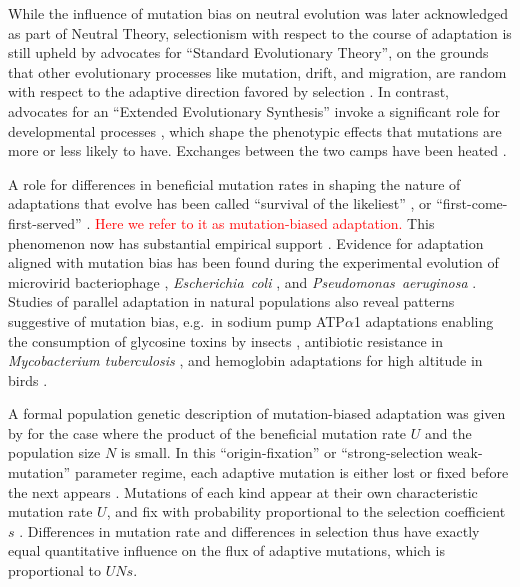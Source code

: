 \documentclass[9pt,twocolumn,twoside]{article}
\begin{document}
While the influence of mutation bias on neutral evolution was later acknowledged as part of Neutral Theory, selectionism with respect to the course of adaptation is still upheld by advocates for ``Standard Evolutionary Theory'', on the grounds that other evolutionary processes like mutation, drift, and migration, are random with respect to the adaptive direction favored by selection \citep{svensson2019role}. In contrast, advocates for an ``Extended Evolutionary Synthesis'' invoke a significant role for developmental processes \citep{pigliucci2014debate,laland2014does,laland2015}, which shape the phenotypic effects that mutations are more or less likely to have. Exchanges between the two camps have been heated \citep{laland2014does,wray2014does}.

A role for differences in beneficial mutation rates in shaping the nature of adaptations that evolve has been called ``survival of the likeliest'' \citep{mccandlish2014}, or ``first-come-first-served'' \citep{Payne2019}. \textcolor{red}{Here we refer to it as mutation-biased adaptation.} This phenomenon now has substantial empirical support \citep{stoltzfus2019blogPart1}. Evidence for adaptation aligned with mutation bias has been found during the experimental evolution of microvirid bacteriophage \citep{Rokyta2005,sackman2017mutation}, \textit{Escherichia~coli} \citep{Couce2015}, and \textit{Pseudomonas~aeruginosa} \citep{MacLean2010,Stoltzfus2017parallel}. Studies of parallel adaptation in natural populations also reveal patterns suggestive of mutation bias, e.g.~in sodium pump ATP$\alpha$1 adaptations enabling the consumption of glycosine toxins by insects \citep{Stoltzfus2017parallel}, antibiotic resistance in \textit{Mycobacterium tuberculosis} \citep{Payne2019}, and hemoglobin adaptations for high altitude in birds \citep{storz2019role}.

A formal population genetic description of mutation-biased adaptation was given by \citet{yampolsky2001bias} for the case where the product of the beneficial mutation rate $U$ and the population size $N$ is small. In this ``origin-fixation'' or ``strong-selection weak-mutation'' parameter regime, each adaptive mutation is either lost or fixed before the next appears \citep{yampolsky2001bias,mccandlish2014}. Mutations of each kind appear at their own characteristic mutation rate $U$, and fix with probability proportional to the selection coefficient $s$ \citep{haldane_1927}. Differences in mutation rate and differences in selection thus have exactly equal quantitative influence on the flux of adaptive mutations, which is proportional to $UNs$.
\end{document}
